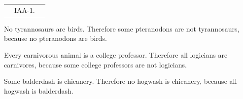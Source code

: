 \begin{exercises}
{\begin{longtabu}{X[3,l,p]X[2,l,p]X[1,l,p]}
&

IAA-1. 
\end{longtabu}
}
                        
                                                                        
\item No tyrannosaurs are birds. Therefore some pteranodons are not tyrannosaurs, because no pteranodons are birds.  


\item Every carnivorous animal is a college professor. Therefore all logicians are carnivores, because some college professors are not logicians.
 

\item Some balderdash is chicanery. Therefore no hogwash is chicanery, because all hogwash is balderdash.  



\end{exercises}
